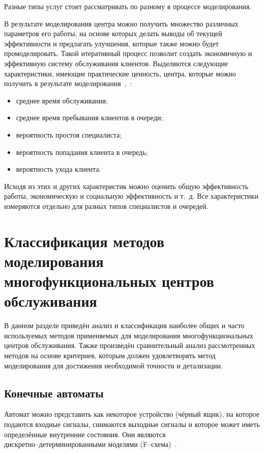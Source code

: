 Разные типы услуг стоит рассматривать по разному в процессе моделирования.

В результате моделирования центра можно получить множество различных параметров его работы, на основе которых делать выводы об текущей эффективности и предлагать улучшения, которые также можно будет промоделировать. Такой итеративный процесс позволит создать экономичную и эффективную систему обслуживания клиентов. Выделяются следующие характеристики, имеющие практические ценность, центра, которые можно получить в результате моделирования~\cite{har1},~\cite{har2}:
\begin{itemize}[label=---]
	\item среднее время обслуживания;
	\item среднее время пребывания клиентов в очереди;
	\item вероятность простоя специалиста;
	\item вероятность попадания клиента в очередь;
	\item вероятность ухода клиента.
\end{itemize}

Исходя из этих и других характеристик можно оценить общую эффективность работы, экономическую и социальную эффективность и т.~д. Все характеристики измеряются отдельно для разных типов специалистов и очередей. 

\section[Классификация методов моделирования\\многофункциональных центров обслуживания]{Классификация методов моделирования\\многофункциональных центров\\обслуживания}

В данном разделе приведён анализ и классификация наиболее общих и часто используемых методов применяемых для моделирования многофункциональных центров обслуживания. Также произведён сравнительный анализ рассмотренных методов на основе критериев, которым должен удовлетворять метод моделирования для достижения необходимой точности и детализации.

\subsection{Конечные автоматы}

Автомат можно представить как некоторое устройство (чёрный ящик), на которое подаются входные сигналы, снимаются выходные сигналы и которое может иметь определённые внутренние состояния. Они являются \\ \mbox{дискретно--детерминированными} моделями (F--схема)~\cite{ak_det}.


